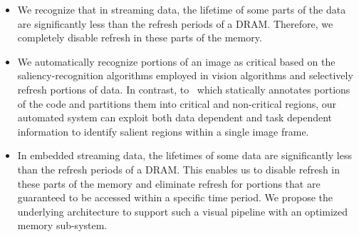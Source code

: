 \begin{itemize}[leftmargin=*]
\item We recognize that in streaming data, the lifetime of some parts of the data are significantly less than the refresh periods of a DRAM. Therefore, we completely disable refresh in these parts of the memory. 
\item We automatically recognize portions of an image as critical based on the saliency-recognition algorithms employed in vision algorithms and selectively refresh portions of data.
In contrast, to~\cite{Liu2011} which statically annotates portions of the code and partitions them into critical and non-critical regions, our automated system can exploit both data dependent and task dependent information to identify salient regions within a single image frame. 
\item In embedded streaming data, the lifetimes of some data are significantly less than the refresh periods of a DRAM. This enables us to disable refresh in these parts of the memory and eliminate refresh for portions that are guaranteed to be accessed within a specific time period. We propose the underlying architecture to support such a visual pipeline with an optimized memory sub-system.
\end{itemize}


